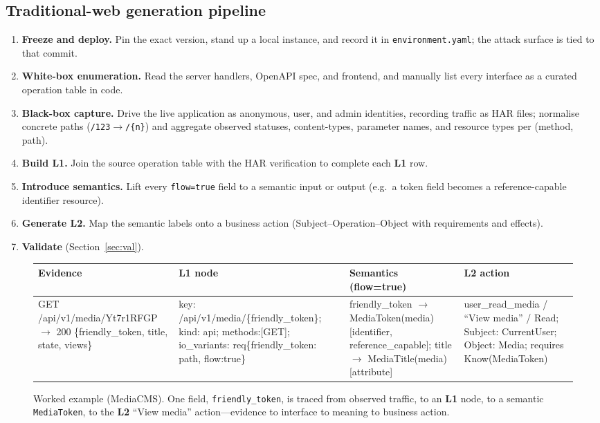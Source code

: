 \documentclass[11pt,a4paper]{article}
\newcommand{\cd}[1]{\lstinline[basicstyle=\ttfamily\small]|#1|}
\renewcommand{\L}[1]{\textbf{L#1}}
\begin{document}
\subsection{Traditional-web generation pipeline}
\begin{enumerate}[leftmargin=1.7em,itemsep=2pt]
\item \textbf{Freeze and deploy.} Pin the exact version, stand up a local instance, and
      record it in \cd{environment.yaml}; the attack surface is tied to that commit.
\item \textbf{White-box enumeration.} Read the server handlers, OpenAPI spec, and
      frontend, and manually list every interface as a curated operation table in code.
\item \textbf{Black-box capture.} Drive the live application as anonymous, user, and
      admin identities, recording traffic as HAR files; normalise concrete paths
      (\cd{/123}$\to$\cd{/{n}}) and aggregate observed statuses, content-types,
      parameter names, and resource types per (method, path).
\item \textbf{Build L1.} Join the source operation table with the HAR verification to
      complete each \L1 row.
\item \textbf{Introduce semantics.} Lift every \cd{flow=true} field to a semantic input
      or output (e.g.\ a token field becomes a reference-capable identifier resource).
\item \textbf{Generate L2.} Map the semantic labels onto a business action
      (Subject--Operation--Object with requirements and effects).
\item \textbf{Validate} (Section~\ref{sec:val}).
\end{enumerate}

\begin{figure}[ht]\centering\footnotesize
\begin{tabular}{@{}p{3.3cm}p{3.6cm}p{3.6cm}p{3.6cm}@{}}
\toprule
\textbf{Evidence} & \textbf{L1 node} & \textbf{Semantics (flow=true)} & \textbf{L2 action}\\
\midrule
\ttfamily GET /api/v1/media/\allowbreak Yt7r1RFGP $\to$ 200 \{friendly\_token, title, state, views\}
&
\ttfamily key: /api/v1/media/\{friendly\_token\}; kind: api; methods:[GET]; io\_variants: req\{friendly\_token: path, flow:true\}
&
\ttfamily friendly\_token $\to$ MediaToken(media) [identifier, reference\_capable]; title $\to$ MediaTitle(media) [attribute]
&
\ttfamily user\_read\_media / ``View media'' / Read; Subject: CurrentUser; Object: Media; requires Know(MediaToken)\\
\bottomrule
\end{tabular}
\caption{Worked example (MediaCMS). One field, \cd{friendly_token}, is traced from
observed traffic, to an \L1 node, to a semantic \cd{MediaToken}, to the \L2 ``View
media'' action---evidence to interface to meaning to business action.}
\label{fig:worked}
\end{figure}
\end{document}
